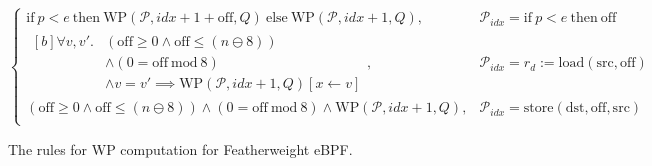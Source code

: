 \begin{figure}[H]
\[\begin{cases}
    \mathrm{if} ~ p < e ~ \mathrm{then} ~ \mathrm{WP}(\mathcal{P}, idx+1+\mathrm{off}, Q) ~ \mathrm{else} ~ \mathrm{WP}(\mathcal{P},idx+1, Q) , & \mathcal{P}_{idx} = \mathrm{if} ~ p < e ~ \mathrm{then} ~ \mathrm{\mathrm{off}} \\
    \begin{aligned}[b] \forall v , v' . & (\mathrm{off} \geq 0 \land \mathrm{off} \leq (n \ominus 8) ) \\
                                        & \land (0 = \mathrm{off} ~ \mathrm{mod} ~ 8)
      \\ & \land v = v' \implies \mathrm{WP}(\mathcal{P}, idx+1, Q)[x \leftarrow v] \end{aligned}  , & \mathcal{P}_{idx} = r_d := \mathrm{load(src, off)} \\
(\mathrm{off} \geq 0 \land \mathrm{off} \leq (n \ominus 8) ) \land (0 = \mathrm{off} ~ \mathrm{mod} ~ 8)
\land \mathrm{WP}(\mathcal{P}, idx+1, Q)  , & \mathcal{P}_{idx} = \mathrm{store(dst, off, src)} \\
  \end{cases}
\]

  \caption{The rules for WP computation for Featherweight eBPF.}
  \label{fig:wp-rules}
\end{figure}
